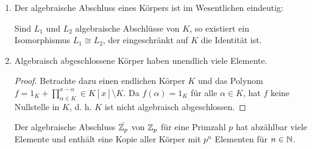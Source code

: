 \begin{rem}\label{rem8_4}
	\begin{enumerate}[label=(\roman*)]
		\item Der algebraische Abschluss eines Körpers ist im Wesentlichen eindeutig:
		
		Sind $L_1$ und $L_2$ algebraische Abschlüsse von $K$, so existiert ein Isomorphismus $L_1 \cong L_2$, der eingeschränkt auf $K$ die Identität ist.
		\item Algebraisch abgeschlossene Körper haben unendlich viele Elemente.
		\begin{proof}
			Betrachte dazu einen endlichen Körper $K$ und das Polynom $f = 1_K + \prod_{\alpha \in K}^{x - \alpha} \in K[x] \setminus K$. Da $f(\alpha) = 1_K$ für alle $\alpha \in K$, hat $f$ keine Nullstelle in $K$, d. h. $K$ ist nicht algebraisch abgeschlossen.
		\end{proof}
		Der algebraische Abschluss $\bar{\mathbb{Z}_p}$ von $\mathbb{Z}_p$ für eine Primzahl $p$ hat abzählbar viele Elemente und enthält eine Kopie aller Körper mit $p^n$ Elementen für $n \in \mathbb{N}$.
	\end{enumerate}
\end{rem}